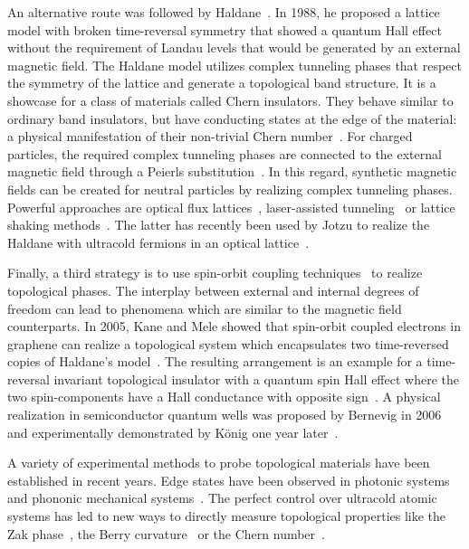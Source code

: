 An alternative route was followed by Haldane~\cite{Haldane1988}.
In 1988, he proposed a lattice model with broken time-reversal symmetry that showed a quantum Hall effect without the requirement of Landau levels that would be generated by an external magnetic field.
The Haldane model utilizes complex tunneling phases that respect the symmetry of the lattice and generate a topological band structure.
It is a showcase for a class of materials called Chern insulators.
They behave similar to ordinary band insulators, but have conducting states at the edge of the material: a physical manifestation of their non-trivial Chern number~\cite{Hatsugai1993}.
For charged particles, the required complex tunneling phases are connected to the external magnetic field through a Peierls substitution~\cite{Peierls1933}.
In this regard, synthetic magnetic fields can be created for neutral particles by realizing complex tunneling phases.
Powerful approaches are optical flux lattices~\cite{Cooper2011}, laser-assisted tunneling~\cite{Aidelsburger2011,Aidelsburger2013,Miyake2013,Kennedy2015} or lattice shaking methods~\cite{Struck2012,Struck2013}.
The latter has recently been used by Jotzu \etal to realize the Haldane  with ultracold fermions in an optical lattice~\cite{Jotzu2014}.

Finally, a third strategy is to use spin-orbit coupling techniques~\cite{Lin2011,Cheuk2012,Wang2012,Hamner2014,Jimenez-Garcia2015} to realize topological phases.
The interplay between external and internal degrees of freedom can lead to phenomena which are similar to the magnetic field counterparts.
In 2005, Kane and Mele showed that spin-orbit coupled electrons in graphene can realize a topological system which encapsulates two time-reversed copies of Haldane's model~\cite{Kane2005a,Kane2005}.
The resulting arrangement is an example for a time-reversal invariant topological insulator with a quantum spin Hall effect where the two spin-components have a Hall conductance with opposite sign~\cite{Qi2011,Hasan2010}.
A physical realization in semiconductor quantum wells was proposed by Bernevig \etal in 2006~\cite{Bernevig2006a,Bernevig2006b} and experimentally demonstrated by König \etal one year later~\cite{Konig2007}.

A variety of experimental methods to probe topological materials have been established in recent years.
Edge states have been observed in photonic systems~\cite{Hafezi2011a,Hafezi2013,Rechtsman2013} and phononic mechanical systems~\cite{Susstrunk2015}.
The perfect control over ultracold atomic systems has led to new ways to directly measure topological properties like the Zak phase~\cite{Atala2013}, the Berry curvature~\cite{Duca2014} or the Chern number~\cite{Aidelsburger2014}.

